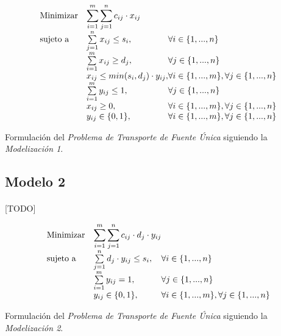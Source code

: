 \documentclass[a4paper, spanish]{article}
\begin{document}
      \begin{eqfloat}
        \begin{equation}
          \begin{array}{ll@{}ll}
            \text{Minimizar}	& \displaystyle \sum\limits_{i=1}^{m}\sum\limits_{j=1}^{n}c_{ij} \cdot x_{ij} \\
            \text{sujeto a}		& \sum\limits_{j=1}^{n} x_{ij}	\leq s_{i}, & \forall i \in \{1,...,n\}\\
                              &	\sum\limits_{i=1}^{m} x_{ij}	\geq d_{j}, & \forall j \in \{1,...,n\} \\
                              & x_{ij}	\leq min(s_{i}, d_{j}) \cdot y_{ij}, 	& \forall i \in \{1,...,m\}, \forall j \in \{1,...,n\} \\
                              &	\sum\limits_{i=1}^{m} y_{ij}	\leq 1, & \forall j \in \{1,...,n\} \\
                              & x_{ij}	\geq 0, 	& \forall i \in \{1,...,m\}, \forall j \in \{1,...,n\} \\
                              & y_{ij}	\in \{0, 1\}, 	& \forall i \in \{1,...,m\}, \forall j \in \{1,...,n\} \\
          \end{array}
        \end{equation}
        \caption{Formulación del \emph{Problema de Transporte de Fuente Única} siguiendo la \emph{Modelización 1}.}
        \label{eq:single-source-transportation-model-1}
      \end{eqfloat}

    \subsection{Modelo 2}
    \label{sec:approach-2}

      \paragraph{}
      [TODO]


      \begin{eqfloat}
        \begin{equation}
          \begin{array}{ll@{}ll}
            \text{Minimizar}	& \displaystyle \sum\limits_{i=1}^{m}\sum\limits_{j=1}^{n}c_{ij} \cdot d_{j} \cdot y_{ij} \\
            \text{sujeto a}		& \sum\limits_{j=1}^{n} d_{j} \cdot y_{ij}	\leq s_{i}, & \forall i \in \{1,...,n\}\\
                              &	\sum\limits_{i=1}^{m} y_{ij}	= 1, & \forall j \in \{1,...,n\} \\
                              & y_{ij}	\in \{0, 1\}, 	& \forall i \in \{1,...,m\}, \forall j \in \{1,...,n\}
          \end{array}
        \end{equation}
        \caption{Formulación del \emph{Problema de Transporte de Fuente Única} siguiendo la \emph{Modelización 2}.}
        \label{eq:single-source-transportation-model-2}
      \end{eqfloat}
\end{document}
